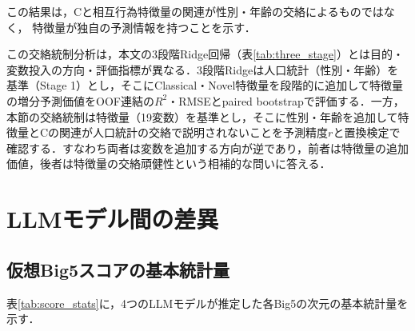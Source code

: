 \documentclass[dvipdfmx,11pt,a4paper]{bxjsarticle}
\renewcommand{\_}{\paperorigunderscore\allowbreak}%
\begin{document}
この結果は，Cと相互行為特徴量の関連が性別・年齢の交絡によるものではなく，
特徴量が独自の予測情報を持つことを示す．

この交絡統制分析は，本文の3段階Ridge回帰（表\ref{tab:three_stage}）とは目的・変数投入の方向・評価指標が異なる．3段階Ridgeは人口統計（性別・年齢）を基準（Stage 1）とし，そこにClassical・Novel特徴量を段階的に追加して特徴量の増分予測価値をOOF連結の$R^2$・RMSEとpaired bootstrapで評価する．一方，本節の交絡統制は特徴量（19変数）を基準とし，そこに性別・年齢を追加して特徴量とCの関連が人口統計の交絡で説明されないことを予測精度$r$と置換検定で確認する．すなわち両者は変数を追加する方向が逆であり，前者は特徴量の追加価値，後者は特徴量の交絡頑健性という相補的な問いに答える．


\section{LLMモデル間の差異}
\label{sec:appendix_llm}

\subsection{仮想Big5スコアの基本統計量}
\label{sec:appendix_score_stats}

表\ref{tab:score_stats}に，4つのLLMモデルが推定した各Big5の次元の基本統計量を示す．
\end{document}
